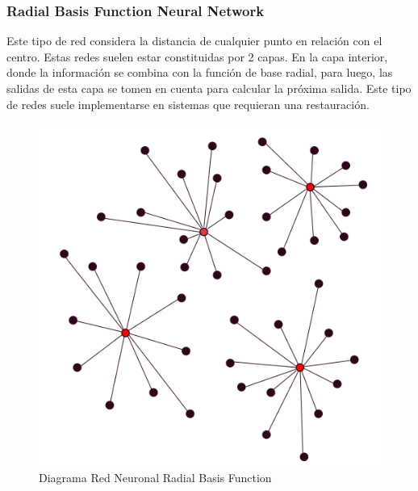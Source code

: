\documentclass[12pt, a4paper, titlepage]{report}
\begin{document}
				\subsubsection{Radial Basis Function Neural Network}
				Este tipo de red considera la distancia de cualquier punto en relación con el centro. Estas redes suelen estar constituidas por 2 capas. En la capa interior, donde la información se combina con la función de base radial, para luego, las salidas de esta capa se tomen en cuenta para calcular la próxima salida. Este tipo de redes suele implementarse en sistemas que requieran una restauración.\cite{refTiposRedesNeu2}\par
				\begin{figure}[H]
					\includegraphics[width=12cm]{./imagenes/MarcoTeorico/RedesN/Radial.png}
					\centering 
					\caption{Diagrama Red Neuronal Radial Basis Function}
				\end{figure}
\end{document}
